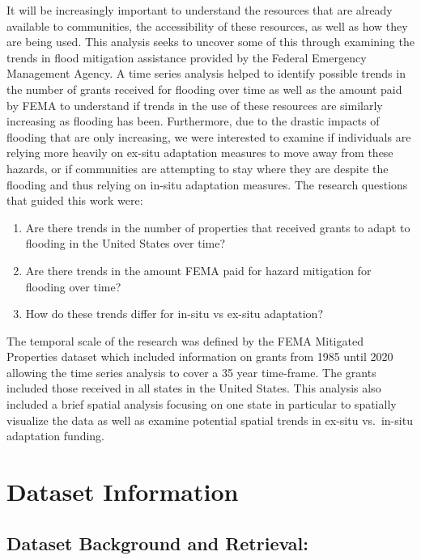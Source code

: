\documentclass[
  12pt,
]{article}
\providecommand{\tightlist}{%
  \setlength{\itemsep}{0pt}\setlength{\parskip}{0pt}}
\begin{document}
It will be increasingly important to understand the resources that are
already available to communities, the accessibility of these resources,
as well as how they are being used. This analysis seeks to uncover some
of this through examining the trends in flood mitigation assistance
provided by the Federal Emergency Management Agency. A time series
analysis helped to identify possible trends in the number of grants
received for flooding over time as well as the amount paid by FEMA to
understand if trends in the use of these resources are similarly
increasing as flooding has been. Furthermore, due to the drastic impacts
of flooding that are only increasing, we were interested to examine if
individuals are relying more heavily on ex-situ adaptation measures to
move away from these hazards, or if communities are attempting to stay
where they are despite the flooding and thus relying on in-situ
adaptation measures. The research questions that guided this work were:

\begin{enumerate}
\def\labelenumi{\arabic{enumi}.}
\tightlist
\item
  Are there trends in the number of properties that received grants to
  adapt to flooding in the United States over time?
\item
  Are there trends in the amount FEMA paid for hazard mitigation for
  flooding over time?
\item
  How do these trends differ for in-situ vs ex-situ adaptation?
\end{enumerate}

The temporal scale of the research was defined by the FEMA Mitigated
Properties dataset which included information on grants from 1985 until
2020 allowing the time series analysis to cover a 35 year time-frame.
The grants included those received in all states in the United States.
This analysis also included a brief spatial analysis focusing on one
state in particular to spatially visualize the data as well as examine
potential spatial trends in ex-situ vs.~in-situ adaptation funding.

\newpage

\hypertarget{dataset-information}{%
\section{Dataset Information}\label{dataset-information}}

\hypertarget{dataset-background-and-retrieval}{%
\subsection{Dataset Background and
Retrieval:}\label{dataset-background-and-retrieval}}
\end{document}
